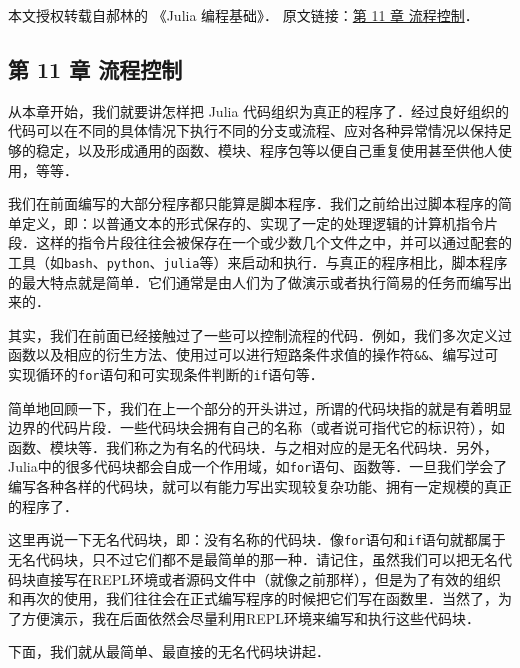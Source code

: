 
本文授权转载自郝林的 《Julia 编程基础》． 原文链接：\href{https://github.com/hyper0x/JuliaBasics/blob/master/book/ch11.md}{第 11 章 流程控制}．


\subsection{第 11 章 流程控制}

从本章开始，我们就要讲怎样把 Julia 代码组织为真正的程序了．经过良好组织的代码可以在不同的具体情况下执行不同的分支或流程、应对各种异常情况以保持足够的稳定，以及形成通用的函数、模块、程序包等以便自己重复使用甚至供他人使用，等等．

我们在前面编写的大部分程序都只能算是脚本程序．我们之前给出过脚本程序的简单定义，即：以普通文本的形式保存的、实现了一定的处理逻辑的计算机指令片段．这样的指令片段往往会被保存在一个或少数几个文件之中，并可以通过配套的工具（如\verb|bash|、\verb|python|、\verb|julia|等）来启动和执行．与真正的程序相比，脚本程序的最大特点就是简单．它们通常是由人们为了做演示或者执行简易的任务而编写出来的．

其实，我们在前面已经接触过了一些可以控制流程的代码．例如，我们多次定义过函数以及相应的衍生方法、使用过可以进行短路条件求值的操作符\verb|&&|、编写过可实现循环的\verb|for|语句和可实现条件判断的\verb|if|语句等．

简单地回顾一下，我们在上一个部分的开头讲过，所谓的代码块指的就是有着明显边界的代码片段．一些代码块会拥有自己的名称（或者说可指代它的标识符），如函数、模块等．我们称之为有名的代码块．与之相对应的是无名代码块．另外，Julia中的很多代码块都会自成一个作用域，如\verb|for|语句、函数等．一旦我们学会了编写各种各样的代码块，就可以有能力写出实现较复杂功能、拥有一定规模的真正的程序了．

这里再说一下无名代码块，即：没有名称的代码块．像\verb|for|语句和\verb|if|语句就都属于无名代码块，只不过它们都不是最简单的那一种．请记住，虽然我们可以把无名代码块直接写在REPL环境或者源码文件中（就像之前那样），但是为了有效的组织和再次的使用，我们往往会在正式编写程序的时候把它们写在函数里．当然了，为了方便演示，我在后面依然会尽量利用REPL环境来编写和执行这些代码块．

下面，我们就从最简单、最直接的无名代码块讲起．
